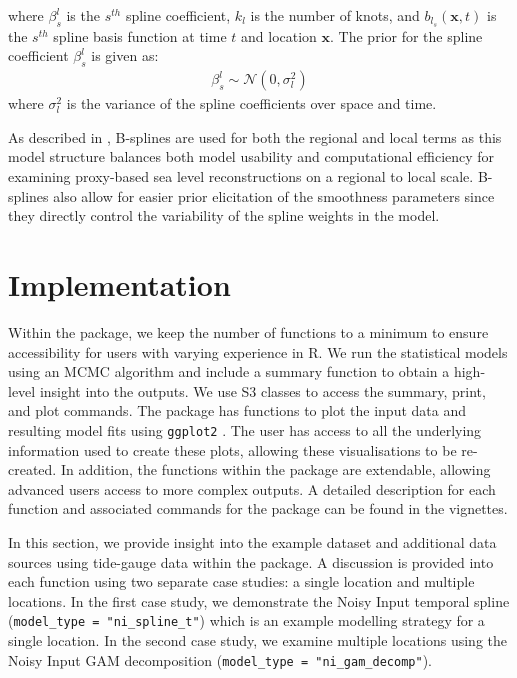 where \(\beta^{l}_s\) is the \(s^{th}\) spline coefficient, \(k_l\) is the number of knots, and \(b_{l_s}(\mathbf{x},t)\) is the \(s^{th}\) spline basis function at time \(t\) and location \(\mathbf{x}\). The prior for the spline coefficient \(\beta^{l}_s\) is given as:
\begin{align}
\beta^{l}_s \sim \mathcal{N}(0,\sigma_l^2)
\end{align}
where \(\sigma_l^2\) is the variance of the spline coefficients over space and time.

As described in \citet{Upton2023noisy}, B-splines are used for both the regional and local terms as this model structure balances both model usability and computational efficiency for examining proxy-based sea level reconstructions on a regional to local scale. B-splines also allow for easier prior elicitation of the smoothness parameters since they directly control the variability of the spline weights in the model.

\section{Implementation}\label{implementation}

Within the package, we keep the number of functions to a minimum to ensure accessibility for users with varying experience in R. We run the statistical models using an MCMC algorithm and include a summary function to obtain a high-level insight into the outputs. We use S3 classes to access the summary, print, and plot commands. The package has functions to plot the input data and resulting model fits using \texttt{ggplot2} \citep{Wickham2016}. The user has access to all the underlying information used to create these plots, allowing these visualisations to be re-created. In addition, the functions within the package are extendable, allowing advanced users access to more complex outputs. A detailed description for each function and associated commands for the  package can be found in the vignettes.

In this section, we provide insight into the example dataset and additional data sources using tide-gauge data within the  package. A discussion is provided into each function using two separate case studies: a single location and multiple locations. In the first case study, we demonstrate the Noisy Input temporal spline (\texttt{model\_type\ =\ "ni\_spline\_t"}) which is an example modelling strategy for a single location. In the second case study, we examine multiple locations using the Noisy Input GAM decomposition (\texttt{model\_type\ =\ "ni\_gam\_decomp"}).

